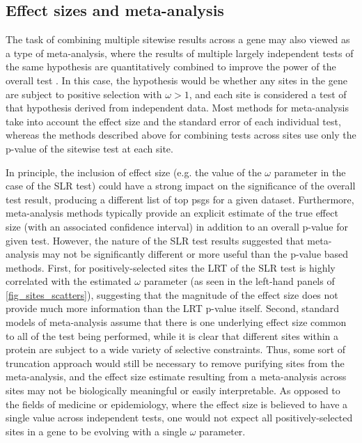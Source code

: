 \subsection{Effect sizes and meta-analysis}


The task of combining multiple sitewise results across a gene may also
viewed as a type of meta-analysis, where the results of multiple
largely independent tests of the same hypothesis are quantitatively
combined to improve the power of the overall test
\citep{Lipsey2001,Stewart2010}. In this case, the hypothesis would be
whether any sites in the gene are subject to positive selection with $\omega>1$, and
each site is considered a test of that hypothesis derived from
independent data. Most methods for meta-analysis take into account the
effect size and the standard error of each individual test, whereas
the methods described above for combining tests across sites use only
the p-value of the sitewise test at each site.

In principle, the inclusion of effect size (e.g. the value of the
$\omega$ parameter in the case of the SLR test) could have a strong
impact on the significance of the overall test result, producing a
different list of top \acp{psg} for a given dataset. Furthermore,
meta-analysis methods typically provide an explicit estimate of the
true effect size (with an associated confidence interval) in addition
to an overall p-value for given test. However, the nature of the SLR
test results suggested that meta-analysis may not be significantly
different or more useful than the p-value based methods. First, for
positively-selected sites the LRT of the SLR test is highly correlated
with the estimated $\omega$ parameter (as seen in the left-hand panels
of \ref{fig_sites_scatters}), suggesting that the magnitude of the
effect size does not provide much more information than the LRT
p-value itself. Second, standard models of meta-analysis assume that
there is one underlying effect size common to all of the test being
performed, while it is clear that different sites within a protein are
subject to a wide variety of selective constraints. Thus, some sort of
truncation approach would still be necessary to remove purifying sites
from the meta-analysis, and the effect size estimate resulting from a
meta-analysis across sites may not be biologically meaningful or
easily interpretable. As opposed to the fields of medicine or
epidemiology, where the effect size is believed to have a single value
across independent tests, one would not expect all positively-selected
sites in a gene to be evolving with a single $\omega$ parameter.

